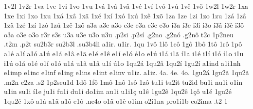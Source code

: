 {    1v2l
    1v2r
    1va
    1ve
    1vi
    1vo
    1vu
    1vá
    1vâ
    1vã
    1vé
    1ví
    1vó
    1vú
    1vê
    1võ
    1w2l
    1w2r
    1xa
    1xe
    1xi
    1xo
    1xu
    1xá
    1xâ
    1xã
    1xé
    1xí
    1xó
    1xú
    1xê
    1xõ
    1za
    1ze
    1zi
    1zo
    1zu
    1zá
    1zâ
    1zã
    1zé
    1zí
    1zó
    1zú
    1zê
    1zõ
    a3a
    a3e
    a3o
    c3c
    e3a
    e3e
    e3o
    i3a
    i3e
    i3i
    i3o
    i3â
    i3ê
    i3ô
    o3a
    o3e
    o3o
    r3r
    s3s
    u3a
    u3e
    u3o
    u3u
    .p2si
    .p2sí
    .g2no
    .g2nó
    .g2nô
    t2c
    1p2neu
    .t2m
    .p2t
    su2b3r
    su2b3l
    .su3b4li
    a1ir.
    u1ir.
    1qu
    1vô
    1lô
    1cô
    1gô
    1bô
    1tô
    1rô
    1pô
    a1é
    a1í
    a1ó
    a1ú
    e1á
    e1â
    e1ã
    e1é
    e1ê
    e1í
    e1ó
    é1o
    e1ú
    i1á
    i1ã
    í1a
    i1é
    i1í
    i1ó
    í1o
    i1u
    i1ú
    o1á
    o1é
    o1í
    o1ó
    u1á
    u1ã
    u1â
    u1í
    ú1o
    1qu2á
    1qu2â
    1qu2í
    1gu2í
    a1ind
    a1i1nh
    e1imp
    e1inc
    e1inf
    e1ing
    e1ins
    e1int
    e1inv
    u1iz.
    a1iz.
    4a.
    4e.
    4o.
    1gu2á
    1gu2ã
    1qu2ã
    .m2n
    c2za
    .s2
    1p2seu1d
    1dô
    1fô
    1mô
    1nô
    1sô
    1zô
    tu1i
    tu2it
    tu2id
    bu1i
    nu1i
    o1in
    u1in
    su1i
    í1e
    ju1i
    fu1i
    du1i
    do1im
    au1i
    u1i1ç
    u1ê
    1gu2ê
    1qu2ê
    1çô
    u1é
    1gu2é
    1qu2é
    1xô
    a1â
    a1ã
    a1ô
    e1ô
    .ne4o
    o1ã
    o1ê
    o1im
    o2i1na
    pro1i1b
    co2ima
    .t2
    1-
}

